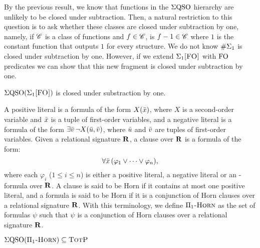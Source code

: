 By the previous result, we know that functions in the $\Sigma{\rm QSO}$ hierarchy are unlikely to be closed under subtraction. Then, a natural restriction to this question is to ask whether these classes are closed under subtraction by one, namely, if $\mathscr{C}$ is a class of functions and $f \in \mathscr{C}$, is $f-1 \in \mathscr{C}$ where $1$ is the constant function that outputs $1$ for every structure. 
We do not know $\#\Sigma_{1}$ is closed under subtraction by one. However, if we extend $\Sigma_{1}\textsc{[FO]}$ with ${\rm FO}$ predicates we can show that this new fragment is closed under subtraction by one.
\begin{theorem} \label{sigmafo-minusone}
	$\Sigma{\rm QSO}(\Sigma_{1}\textsc{[FO]})$ is closed under substraction by one.
\end{theorem}


A positive literal is a formula of the form $X(\bar{x})$, where $X$ is a second-order variable and $\bar{x}$ is a tuple of first-order variables, and a negative literal is a formula of the form $\exists \bar{v} \, \neg X(\bar{u},\bar{v})$, where $\bar{u}$ and $\bar{v}$ are tuples of first-order variables. Given a relational signature $\mathbf{R}$, a clause over $\mathbf{R}$ is a formula of the form:
$$
\forall \bar{x} \, (\varphi_1 \vee \cdots \vee \varphi_n),
$$
where each $\varphi_i$ ($1 \leq i \leq n$) is either a positive literal, a negative literal or an \fo-formula over $\mathbf{R}$.  A clause is said to be Horn if it contains at most one positive literal, and a formula is said to be Horn if it is a conjunction of Horn clauses over a relational signature $\mathbf{R}$. With this terminology, we define $\Pi_1\textsc{-Horn}$ as the set of formulas $\psi$ such that $\psi$ is a conjunction of Horn clauses over a relational signature $\mathbf{R}$. 

\begin{proposition}\label{prop:uhorn-pe}
$\Sigma{\rm QSO}(\Pi_1\textsc{-Horn}) \subseteq \text{\sc TotP}$
\end{proposition}

